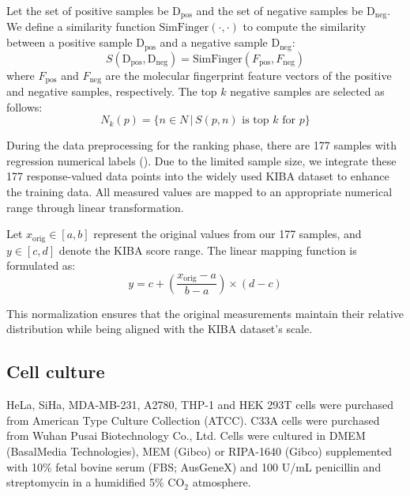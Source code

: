 \documentclass[unnumsec,webpdf,contemporary,large]{oup-authoring-template}%
\theoremstyle{thmstyleone}%
\theoremstyle{thmstyletwo}%
\theoremstyle{thmstylethree}%
\begin{document}
Let the set of positive samples be $\text{D}_{\text{pos}}$ and the set of negative samples be $\text{D}_{\text{neg}}$. We define a similarity function $\text{SimFinger}(\cdot,\cdot)$ to compute the similarity between a positive sample $\text{D}_{\text{pos}}$ and a negative sample $\text{D}_{\text{neg}}$:
\begin{equation}
S(\text{D}_{\text{pos}}, \text{D}_{\text{neg}}) = \text{SimFinger}(F_{\text{pos}}, F_{\text{neg}})
\end{equation}
where $F_{\text{pos}}$ and $F_{\text{neg}}$ are the molecular fingerprint feature vectors of the positive and negative samples, respectively. The top $k$ negative samples are selected as follows:
\begin{equation}
N_k(p) = \{n \in N \,|\, S(p, n) \text{ is top } k \text{ for } p\}
\end{equation}

During the data preprocessing for the ranking phase, there are 177 samples with regression numerical labels (\citealt{67}). Due to the limited sample size, we integrate these 177 response-valued data points into the widely used KIBA dataset to enhance the training data. All measured values are mapped to an appropriate numerical range through linear transformation.

Let $x_{\text{orig}} \in [a,b]$ represent the original values from our 177 samples, and $y \in [c,d]$ denote the KIBA score range. The linear mapping function is formulated as:
\begin{equation}
y = c + \left( \frac{x_{\text{orig}} - a}{b - a} \right) \times (d - c)
\end{equation}

This normalization ensures that the original measurements maintain their relative distribution while being aligned with the KIBA dataset's scale.


\subsection*{Cell culture}

HeLa, SiHa, MDA-MB-231, A2780, THP-1 and HEK 293T cells were purchased from American Type Culture Collection (ATCC). C33A cells were purchased from Wuhan Pusai Biotechnology Co., Ltd. Cells were cultured in DMEM (BasalMedia Technologies), MEM (Gibco) or RIPA-1640 (Gibco) supplemented with 10\% fetal bovine serum (FBS; AusGeneX) and 100 U/mL penicillin and streptomycin in a humidified 5\% CO$_2$ atmosphere. 
\end{document}
